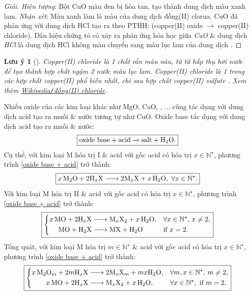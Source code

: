 \documentclass{article}
\newtheorem{luuy}{Lưu ý}
\begin{document}
\begin{proof}[Giải]
	\textit{Hiện tượng}: Bột CuO màu đen bị hòa tan, tạo thành dung dịch màu xanh lam. \textit{Nhận xét}: Màu xanh làm là màu của dung dịch đồng(II) clorua. CuO đã phản ứng với dung dịch HCl tạo ra  theo PTHH:  (copper(II) oxide $\to$ copper(II) chloride). Dấu hiệu chứng tỏ có xảy ra phản ứng hóa học giữa \emph{CuO} \& dung dịch \emph{HCl} là dung dịch HCl không màu chuyển sang màu lục lam của dung dịch .
\end{proof}

\begin{luuy}[]
	Copper(II) chloride \emph{} là 1 chất rắn màu nâu, từ từ hấp thụ hơi nước để tạo thành hợp chất ngậm 2 nước màu lục lam. Copper(II) chloride là 1 trong các hợp chất copper(II) phổ biến nhất, chỉ sau hợp chất copper(II) sulfate \emph{}. Xem thêm \href{https://vi.wikipedia.org/wiki/%C4%90%E1%BB%93ng(II)_chloride}{Wikipedia\emph{\texttt{/}}đồng(II) chloride}.
\end{luuy}
Nhiều oxide của các kim loại khác như MgO, CaO, , $\ldots$ cũng tác dụng với dung dịch acid tạo ra muối \& nước tương tự như CuO. Oxide base tác dụng với dung dịch acid tạo ra muối \& nước:
\begin{align}
	\label{oxide base + acid}
	\boxed{\mbox{oxide base} + \mbox{acid}\to\mbox{salt} + \ce{H2O}.}
\end{align}
Cụ thể, với kim loại M hóa trị I \& acid  với gốc acid  có hóa trị $x\in\mathbb{N}^\star$, phương trình \eqref{oxide base + acid} trở thành:
\begin{align}
	\boxed{\ce{$x$M2O + $2$H_xX -> $2$M_xX + $x$H2O},\ \forall x\in\mathbb{N}^\star.}
\end{align}
Với kim loại M hóa trị II \& acid  với gốc acid  có hóa trị $x\in\mathbb{N}^\star$, phương trình \eqref{oxide base + acid} trở thành:
\begin{equation}
	\boxed{\left\{\begin{split}
			\ce{$x$MO + $2$H_xX &-> M_xX2 + $x$H2O},&&\forall x\in\mathbb{N}^\star,\,x\ne2,\\
			\ce{MO + H2X &-> MX + H2O}&&\mbox{if } x = 2.
		\end{split}\right.}
\end{equation}
Tổng quát, với kim loại M hóa trị $m\in\mathbb{N}^\star$ \& acid  với gốc acid  có hóa trị $x\in\mathbb{N}^\star$, phương trình \eqref{oxide base + acid} trở thành:
\begin{equation}
	\boxed{\left\{\begin{split}
			\ce{$x$M2O_m + $2m$H_xX &-> $2$M_xX_m + $mx$H2O},&&\forall m,x\in\mathbb{N}^\star,\,m\ne2,\\
			\ce{$x$MO + $2$H_xX &-> M_xX2 + $x$H2O},&&\forall x\in\mathbb{N}^\star,\mbox{ if } m = 2.
		\end{split}\right.}
\end{equation}
\end{document}
